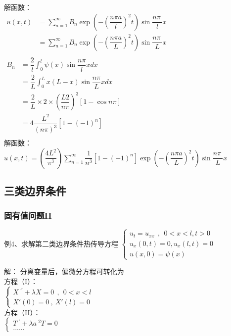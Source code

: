 \begin{frame}
	\frametitle{}	
	解函数：\\ 
	$\displaystyle \begin{array}{llll}
		u(x,t)&=\sum\limits_{n=1}^{\infty } B_n  \exp(-(\dfrac{n\pi a}{l})^2 t) \sin \dfrac{n\pi~}{l} x\\
		&= \sum\limits_{n=1}^{\infty } B_n  \exp(-(\dfrac{n\pi a}{L})^2 t) \sin \dfrac{n\pi~}{L} x \\
	\end{array}$ \\ 
	$\displaystyle \begin{array}{lllllllll}
		B_n&= \dfrac{2}{l}\int_{0 }^{l}  \psi (x) \sin \dfrac{ n\pi }{l} x dx  \\
		&= \dfrac{2}{L}\int_{0 }^{L}  x(L-x) \sin \dfrac{ n\pi }{L} x dx  \\
		&=\dfrac{2}{L} \times2\times (\dfrac{L2}{n\pi})^3  [1-\cos n \pi ]  \\
		&= 4 \dfrac{L^2}{(n\pi)^3}[1-(-1)^n ]  \\
	\end{array}$ \\ 
	解函数：$\displaystyle  u(x,t) =  (\dfrac{4L^2}{\pi ^3}) \sum_{n=1}^{\infty} \dfrac{1}{n^3} [1-(-1)^n ]  \exp(-(\dfrac{n\pi a}{L})^2 t) \sin \dfrac{n\pi~}{L} x  $\\	
\end{frame}	

\subsection{三类边界条件}
\begin{frame}
	\frametitle{固有值问题II}
	\begin{exampleblock} {例4、求解第二类边界条件热传导方程}
	$\displaystyle  \begin{cases}
		u_{t} =u_{xx} ~~,~~ 0<x<l, t>0\\
		u_x (0,t) =0, u_x (l,t)=0 \\
		u(x,0) =\psi(x)
	\end{cases}$ \\	
	\end{exampleblock}
	\alert{解：} 	
	分离变量后，偏微分方程可转化为 \\
	方程（I）：\\
	$\displaystyle  \begin{cases}
		X~^{''} +\lambda X=0  ~~,~~ 0<x<l\\
		X'(0)=0 ~,~X' (l)=0
	\end{cases}$ \\	
	方程（II）：\\
	$\displaystyle  \begin{cases}
		T~^{'} +\lambda {a~^2 T}=0 \\
		......
	\end{cases}$ \\	
\end{frame}	


